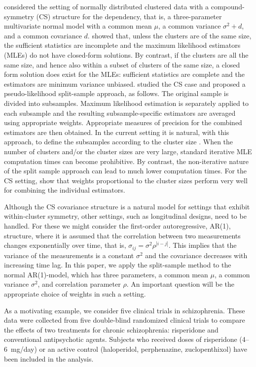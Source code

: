 \documentclass[11pt,a5paper,twoside]{book}
\begin{document}
\cite{hermans2017_cs} considered the setting of normally distributed clustered data with a compound-symmetry (CS) structure for the dependency, that is, a three-parameter multivariate normal model with a common mean $\mu$, a common variance $\sigma^2+d$, and a common covariance $d$. \cite{Lisa2015_2} showed that, unless the clusters are of the same size, the sufficient statistics are incomplete and the maximum likelihood estimators (MLEs) do not have closed-form solutions. By contrast, if the clusters are all the same size, and hence also within a subset of clusters of the same size, a closed form solution does exist for the MLEs: sufficient statistics are complete and the estimators are minimum variance unbiased. \cite{Iddi2011} studied the CS case and proposed a pseudo-likelihood split-sample approach, as follows. The original sample is divided into subsamples. Maximum likelihood estimation is separately applied to each subsample and the resulting subsample-specific estimators are averaged using appropriate weights. Appropriate measures of precision for the combined estimators are then obtained. In the current setting it is natural, with this approach, to define the subsamples according to the cluster size \citep{hermans2017_cs}. When the number of clusters and/or the cluster sizes are very large, standard iterative MLE computation times can become prohibitive. By contrast, the non-iterative nature of the split sample approach can lead to much lower computation times. For the CS setting, \cite{hermans2017_cs} show that
weights proportional to the cluster sizes perform very well for combining the individual estimators.

Although the CS covariance structure is a natural model for settings that exhibit within-cluster symmetry, other settings, such as longitudinal designs, need to be handled. For these we might consider the first-order autoregressive, AR(1), structure, where it is assumed that the correlation between two measurements changes exponentially over time, that is, $\sigma_{ij}=\sigma^2 \rho^{|i-j|}$. This implies that the variance of the measurements is a constant $\sigma^2$ and the covariance decreases with increasing time lag. In this paper, we apply the split-sample method to the normal AR(1)-model, which has three parameters, a common mean $\mu$, a common variance $\sigma^2$, and correlation parameter $\rho$. An important question will be the appropriate choice of weights in such a setting.

As a motivating example, we consider five clinical trials in\label{secmotex} schizophrenia.
These data were collected from five double-blind randomized clinical trials to compare the effects of two treatments
for chronic schizophrenia: risperidone and conventional antipsychotic agents. Subjects who received doses of risperidone (4--6~mg/day) or an active control (haloperidol, perphenazine, zuclopenthixol) have been included in the analysis.
\end{document}

